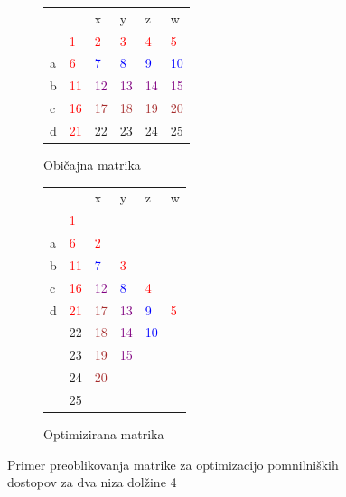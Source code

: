 \documentclass[a4paper,12pt,openright]{book}
\begin{document}
\begin{figure}[H]

\begin{subfigure}{.5\textwidth}
\centering
\begin{tabular}{|l|l|l|l|l|l|}
\cline{3-6}
  \multicolumn{2}{c|}{}  & x & y & z & w\\ \cline{2-6}
 \multicolumn{1}{c|}{} & \textcolor{red}{1} & \textcolor{red}{2} & \textcolor{red}{3} & \textcolor{red}{4} & \textcolor{red}{5}\\ \hline
a  & \textcolor{red}{6} & \textcolor{blue}{7} & \textcolor{blue}{8} & \textcolor{blue}{9} & \textcolor{blue}{10}\\ \hline
b  & \textcolor{red}{11} & \textcolor{purple}{12} & \textcolor{purple}{13} & \textcolor{purple}{14} & \textcolor{purple}{15}\\ \hline
c  & \textcolor{red}{16} & \textcolor{brown}{17} & \textcolor{brown}{18} & \textcolor{brown}{19} & \textcolor{brown}{20} \\ \hline
d  & \textcolor{red}{21} & 22 & 23 & 24 & 25 \\ \hline
\end{tabular}
\caption{Običajna matrika}
\label{normalMatrix}
\end{subfigure}%
\begin{subfigure}{.5\textwidth}
\centering
\begin{tabular}{|l|l|l|l|l|l|}
\cline{3-6}
  \multicolumn{2}{c|}{}  & x & y & z & w \\ \cline{2-6}
 \multicolumn{1}{c|}{} & \textcolor{red}{1} & \multicolumn{4}{c}{} \\ \cline{1-3}
a  & \textcolor{red}{6} & \textcolor{red}{2} &  \multicolumn{3}{c}{} \\ \cline{1-4}
b  & \textcolor{red}{11} & \textcolor{blue}{7} & \textcolor{red}{3} & \multicolumn{2}{c}{}  \\ \cline{1-5}
c  & \textcolor{red}{16} & \textcolor{purple}{12} & \textcolor{blue}{8} & \textcolor{red}{4} & \multicolumn{1}{c}{} \\ \cline{1-6}
d  & \textcolor{red}{21} & \textcolor{brown}{17} & \textcolor{purple}{13} & \textcolor{blue}{9} & \textcolor{red}{5} \\ \hline
 \multicolumn{1}{c|}{} & 22 & \textcolor{brown}{18} & \textcolor{purple}{14} & \textcolor{blue}{10} & \multicolumn{1}{c}{}  \\ \cline{2-5}
\multicolumn{1}{c|}{}  & 23 & \textcolor{brown}{19} & \textcolor{purple}{15} & \multicolumn{2}{c}{}   \\ \cline{2-4}
\multicolumn{1}{c|}{}  & 24 & \textcolor{brown}{20} &  \multicolumn{3}{c}{}   \\ \cline{2-3}
\multicolumn{1}{c|}{}  & 25 & \multicolumn{4}{c}{}  \\ \cline{2-2}
\end{tabular}
\caption{Optimizirana matrika}
\label{diagonalMatrix}
\end{subfigure}%

\caption{Primer preoblikovanja matrike za optimizacijo pomnilniških dostopov za dva niza dolžine 4}
\label{matrixTransformation}
\end{figure}
\end{document}
